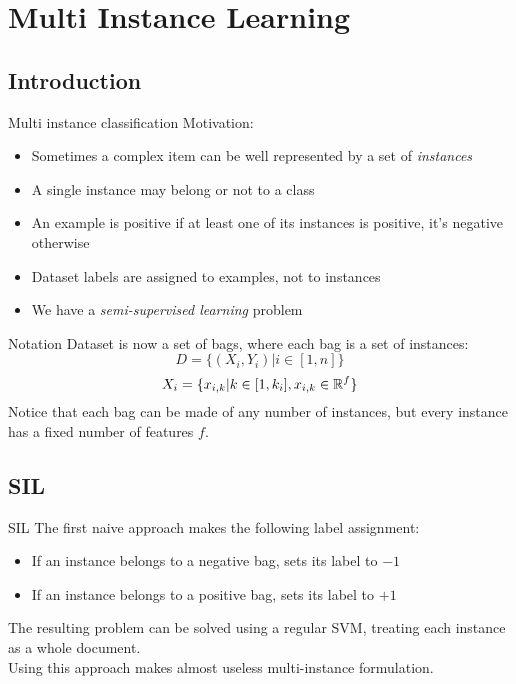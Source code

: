 \section{Multi Instance Learning}
 
\subsection{Introduction}
\begin{frame}{Multi instance classification}
	Motivation:
	\begin{itemize}\setlength\itemsep{1em}
		\item Sometimes a complex item can be well represented by a set of \textit{instances}
		\item A single instance may belong or not to a class
		\item An example is positive if at least one of its instances is positive, it's negative otherwise
		\item Dataset labels are assigned to examples, not to instances
		\item We have a \textit{semi-supervised learning} problem
	\end{itemize}
	\cite{mi1}
\end{frame}

\begin{frame}{Notation}
	Dataset is now a set of bags, where each bag is a set of instances:
	$$D = \{(X_i, Y_i) | i \in [1, n]\}$$
	$$X_i = \{x_{i,k} | k \in [1, k_i], x_{i,k} \in \mathbb{R}^f\}$$
	Notice that each bag can be made of any number of instances, but every instance has a fixed number of features $f$.
\end{frame}

\subsection{SIL}
\begin{frame}{SIL}
	The first naive approach makes the following label assignment:
	\begin{itemize}\setlength\itemsep{1em}
		\item If an instance belongs to a negative bag, sets its label to $-1$
		\item If an instance belongs to a positive bag, sets its label to $+1$
	\end{itemize}
	\vspace{5px}
	The resulting problem can be solved using a regular SVM, treating each instance as a whole document.\\
	\vspace{12px}
	Using this approach makes almost useless multi-instance formulation.
\end{frame}



